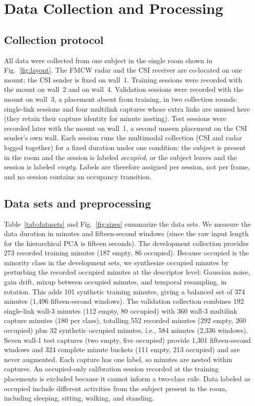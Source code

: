 \documentclass[conference,10pt,letterpaper]{IEEEtran}
\begin{document}
\section{Data Collection and Processing}\label{sec:data}
\subsection{Collection protocol}
All data were collected from one subject in the single room shown in Fig.~\ref{fig:layout}. The FMCW radar and the CSI receiver are co-located on one mount; the CSI sender is fixed on wall~1. Training sessions were recorded with the mount on wall~2 and on wall~4. Validation sessions were recorded with the mount on wall~3, a placement absent from training, in two collection rounds: single-link sessions and four multilink captures whose extra links are unused here (they retain their capture identity for minute nesting). Test sessions were recorded later with the mount on wall~1, a second unseen placement on the CSI sender's own wall. Each session runs the multimodal collection (CSI and radar logged together) for a fixed duration under one condition: the subject is present in the room and the session is labeled \emph{occupied}, or the subject leaves and the session is labeled \emph{empty}. Labels are therefore assigned per session, not per frame, and no session contains an occupancy transition.

\subsection{Data sets and preprocessing}
Table~\ref{tab:datasets} and Fig.~\ref{fig:sizes} summarize the data sets. We measure the data duration in minutes and fifteen-second windows (since the raw input length for the hierarchical PCA is fifteen seconds). The development collection provides 273 recorded training minutes (187 empty, 86 occupied). Because occupied is the minority class in the development sets, we synthesize occupied minutes by perturbing the recorded occupied minutes at the descriptor level: Gaussian noise, gain drift, mixup between occupied minutes, and temporal resampling, in rotation. This adds 101 synthetic training minutes, giving a balanced set of 374 minutes (1,496 fifteen-second windows). The validation collection combines 192 single-link wall-3 minutes (112 empty, 80 occupied) with 360 wall-3 multilink capture minutes (180 per class), totalling 552 recorded minutes (292 empty, 260 occupied) plus 32 synthetic occupied minutes, i.e., 584 minutes (2,336 windows). Seven wall-1 test captures (two empty, five occupied) provide 1,301 fifteen-second windows and 324 complete minute buckets (111 empty, 213 occupied) and are never augmented. Each capture has one label, so minutes are nested within captures. An occupied-only calibration session recorded at the training placements is excluded because it cannot inform a two-class rule. Data labeled as occupied include different activities from the subject present in the room, including sleeping, sitting, walking, and standing.
\end{document}

